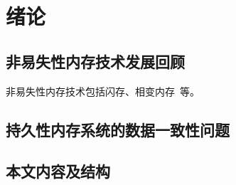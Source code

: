 \chapter{绪论}
\label{chap:intro}

\section{非易失性内存技术发展回顾}

非易失性内存技术包括闪存、相变内存~\cite{Raoux:2008:PRA}等。

\section{持久性内存系统的数据一致性问题}

\section{本文内容及结构}



